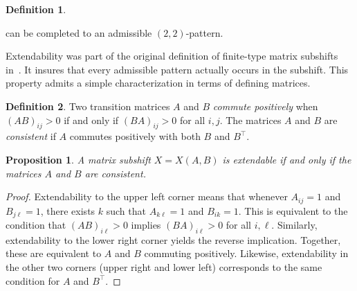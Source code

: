 \documentclass[12pt]{article}
\newtheorem{proposition}[theorem]{Proposition}
\theoremstyle{definition}
\newtheorem{definition}{Definition}
\begin{document}
\begin{definition}
\begin{center}
\begin{tikzpicture}[scale=0.8, rotate=180, every node/.style={font=\small},
  arrowmid/.style={
    postaction={decorate},
    decoration={markings, mark=at position 0.6 with {\arrow{stealth}}}
  }
]
\end{tikzpicture} \qquad
{}
\end{center}
can be completed to an admissible $(2,2)$-pattern.
\end{definition}

Extendability was part of the original definition of finite-type matrix subshifts in~\cite{MarkleyPaul1981}. It insures that every admissible pattern actually occurs in the subshift. This property admits a simple characterization in terms of defining matrices.

\begin{definition}
Two transition matrices $A$ and $B$ \textit{commute positively} when $(AB)_{ij}>0$ if and only if $(BA)_{ij}>0$ for all $i,j$. The matrices $A$ and $B$ are \textit{consistent} if $A$ commutes positively with both $B$ and $B^\top$.
\end{definition}

\begin{proposition}
A matrix subshift $X=X(A,B)$ is extendable if and only if the matrices $A$ and $B$ are consistent.
\end{proposition}
\begin{proof}
Extendability to the upper left corner means that whenever $A_{ij}=1$ and $B_{j\ell}=1$, there exists $k$ such that $A_{k\ell} = 1$ and $B_{ik} = 1$. This is equivalent to the condition that $(AB)_{i\ell}>0$ implies  $(BA)_{i\ell}>0$ for all $i, \ell$. Similarly, extendability to the lower right corner yields the reverse implication. Together, these are equivalent to $A$ and $B$ commuting positively. Likewise, extendability in the other two corners (upper right and lower left) corresponds to the same condition for $A$ and $B^\top$.
\end{proof}
\end{document}
